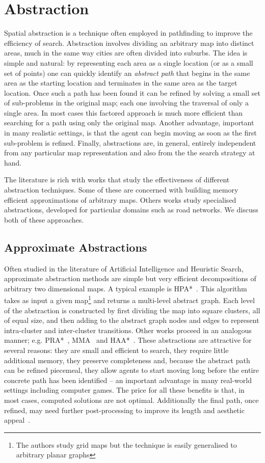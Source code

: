 \section{Abstraction}
\label{cha::lit::abstraction}
Spatial abstraction is a technique often employed in pathfinding to improve
the efficiency of search. Abstraction involves dividing an arbitrary map into
distinct areas, much in the same way cities are often divided into suburbs.
The idea is simple and natural: by representing each area as a single location 
(or as a small set of points) one can quickly identify an \emph{abstract path} 
that begins in the same area as the starting location and terminates in the
same area as the target location.  Once such a path has
been found it can be refined by solving a small set of sub-problems in the
original map; each one involving the traversal of only a single area. In most
cases this factored approach is much more efficient than searching for a path
using only the original map. Another advantage, important in many realistic 
settings, is that the agent can begin moving
as soon as the first sub-problem is refined. Finally, abstractions 
are, in general, entirely independent from any particular map representation and 
also from the the search strategy at hand.

The literature is rich with works that study the effectiveness of different
abstraction techniques.  Some of these are concerned with building memory 
efficient approximations of arbitrary maps.  Others works study specialised 
abstractions, developed for particular domains such as road networks. 
We discuss both of these approaches.

\subsection{Approximate Abstractions}
Often studied in the literature of Artificial Intelligence and Heuristic
Search, approximate abstraction methods are simple but very efficient
decompositions of arbitrary two dimensional maps.  A typical example is
HPA*~\citep{botea04}. This algorithm takes as input a given map\footnote{The
authors study grid maps but the technique is easily generalised to arbitrary
planar graphs} and returns a multi-level abstract graph.  Each level of the
abstraction is constructed by first dividing the map into square clusters, all
of equal size, and then adding to the abstract graph nodes and edges to
represent intra-cluster and inter-cluster transitions.  Other works proceed in
an analogous manner; e.g. PRA*~\citep{sturtevant05}, MMA~\citep{sturtevant07}
and HAA*~\citep{harabor08}.  These abstractions are attractive for several
reasons: they are small and efficient to search, they require little
additional memory, they preserve completeness and, because the abstract path 
can be refined piecemeal, they allow agents to start moving long before the 
entire concrete path has been identified -- an important advantage in many
real-world settings including computer games.
The price for all these benefits is that, in most cases, computed solutions
are not optimal.  Additionally the final path, once refined, may need further
post-processing to improve its length and aesthetic appeal~\citep{pinter01,botea04}.

